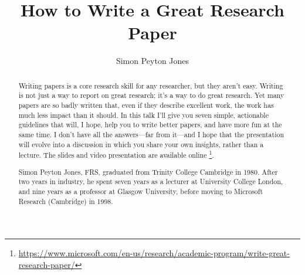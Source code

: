 \documentclass[a4paper,UKenglish]{oasics-v2016}
\title{How to Write a Great Research Paper}
\author{Simon Peyton Jones}
\affil{Microsoft Research Cambridge}
\begin{document}
\maketitle
\begin{abstract}
Writing papers is a core research skill for any researcher, but they aren’t easy. Writing is not just a way to report on great research; it’s a way to do great research. Yet many papers are so badly written that, even if they describe excellent work, the work has much less impact than it should. In this talk I’ll give you seven simple, actionable guidelines that will, I hope, help you to write better papers, and have more fun at the same time. I don’t have all the answers—far from it—and I hope that the presentation will evolve into a discussion in which you share your own insights, rather than a lecture. The slides and video presentation are available online \footnote{\url{https://www.microsoft.com/en-us/research/academic-program/write-great-research-paper/}}.

Simon Peyton Jones, FRS, graduated from Trinity College Cambridge in 1980. After two years in industry, he spent seven years as a lecturer at University College London, and nine years as a professor at Glasgow University, before moving to Microsoft Research (Cambridge) in 1998.
\end{abstract}
\end{document}
